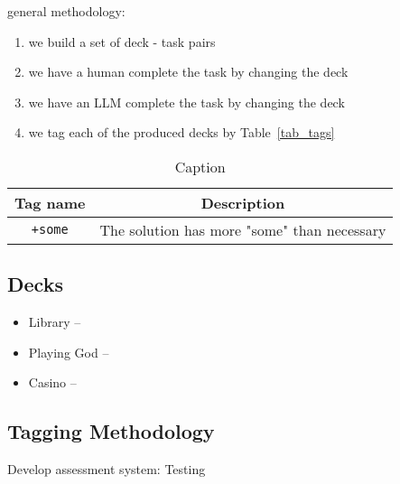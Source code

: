 general methodology:

\begin{enumerate}
    \item we build a set of  deck - task pairs
    \item we have a human complete the task by changing the deck
    \item we have an LLM complete the task by changing the deck
    \item we tag each of the produced decks by Table~\ref{tab_tags}
\end{enumerate}

\begin{table}[]
    \centering
    \caption{Caption}
    \begin{tabular}{|c|c|}
        \hline
        Tag name & Description \\
        \hline
        \verb`+some` & The solution has more "some" than necessary \\
        \hline
    \end{tabular}
    \label{tab:my_label}
\end{table}

\subsection{Decks}

\begin{itemize}
    \item Library -- 
    \item Playing God -- 
    \item Casino -- 
\end{itemize}

\subsection{Tagging Methodology}

Develop assessment system:
Testing 

